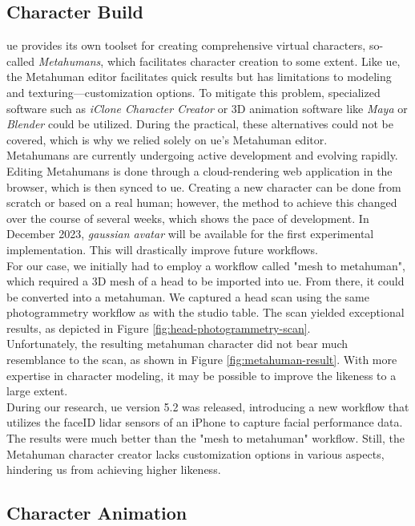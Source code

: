 \documentclass[
  a4paper,  %
  twoside,  %
  bibliography=totoc,
  headsepline,
  cleardoublepage=empty,
  parskip=half,
  draft=false
]{scrbook}
\begin{document}
\subsection*{Character Build}
\gls{ue} provides its own toolset for creating comprehensive virtual characters, so-called \textit{Metahumans}, which facilitates character creation to some extent. Like \gls{ue}, the Metahuman editor facilitates quick results but has limitations to modeling and texturing—customization options. To mitigate this problem, specialized software such as \textit{iClone Character Creator} or 3D animation software like \textit{Maya} or \textit{Blender} could be utilized. During the practical, these alternatives could not be covered, which is why we relied solely on \gls{ue}'s Metahuman editor. \\
Metahumans are currently undergoing active development and evolving rapidly. Editing Metahumans is done through a cloud-rendering web application in the browser, which is then synced to \gls{ue}. Creating a new character can be done from scratch or based on a real human; however, the method to achieve this changed over the course of several weeks, which shows the pace of development. In December 2023, \textit{gaussian avatar} will be available for the first experimental implementation. This will drastically improve future workflows. \\
For our case, we initially had to employ a workflow called "mesh to metahuman", which required a 3D mesh of a head to be imported into \gls{ue}. From there, it could be converted into a metahuman. We captured a head scan using the same photogrammetry workflow as with the studio table. The scan yielded exceptional results, as depicted in Figure \ref{fig:head-photogrammetry-scan}. \\
Unfortunately, the resulting metahuman character did not bear much resemblance to the scan, as shown in Figure \ref{fig:metahuman-result}. With more expertise in character modeling, it may be possible to improve the likeness to a large extent. \\
During our research, \gls{ue} version 5.2 was released, introducing a new workflow that utilizes the faceID lidar sensors of an iPhone to capture facial performance data. The results were much better than the "mesh to metahuman" workflow. Still, the Metahuman character creator lacks customization options in various aspects, hindering us from achieving higher likeness.

\subsection*{Character Animation}
\end{document}

